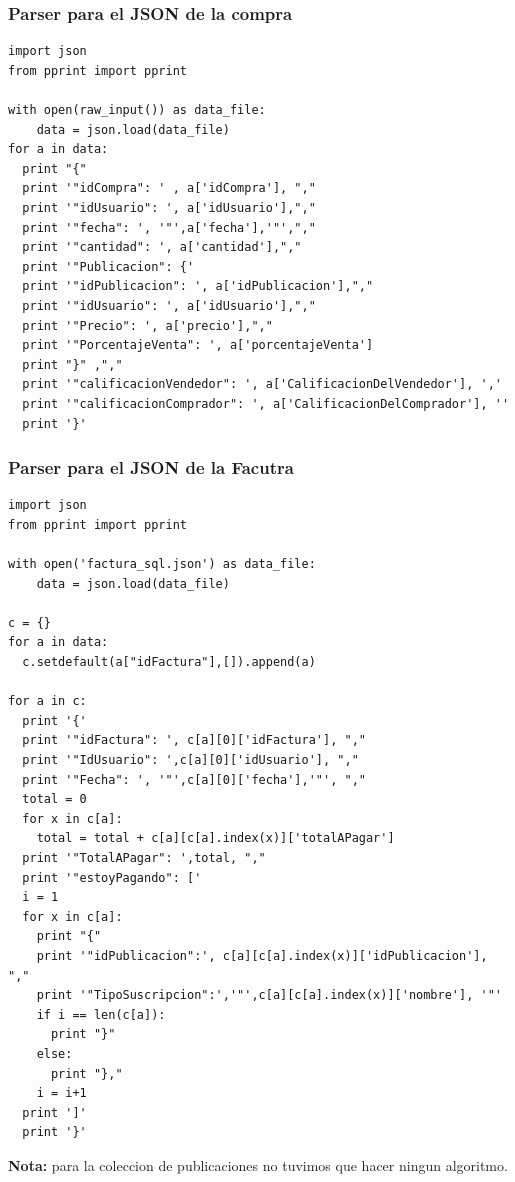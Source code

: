 \documentclass[a4paper, 10pt, twoside]{article}
\begin{document}
\subsubsection{Parser para el JSON de la compra}

\begin{verbatim}
import json
from pprint import pprint

with open(raw_input()) as data_file:    
    data = json.load(data_file)
for a in data:
  print "{"
  print '"idCompra": ' , a['idCompra'], ","
  print '"idUsuario": ', a['idUsuario'],","
  print '"fecha": ', '"',a['fecha'],'"',","
  print '"cantidad": ', a['cantidad'],","
  print '"Publicacion": {'
  print '"idPublicacion": ', a['idPublicacion'],","
  print '"idUsuario": ', a['idUsuario'],","
  print '"Precio": ', a['precio'],","
  print '"PorcentajeVenta": ', a['porcentajeVenta']
  print "}" ,","
  print '"calificacionVendedor": ', a['CalificacionDelVendedor'], ','
  print '"calificacionComprador": ', a['CalificacionDelComprador'], ''
  print '}'

\end{verbatim}

\newpage
\subsubsection{Parser para el JSON de la Facutra}

\begin{verbatim}
import json
from pprint import pprint

with open('factura_sql.json') as data_file:    
    data = json.load(data_file)

c = {}
for a in data:
  c.setdefault(a["idFactura"],[]).append(a)

for a in c:
  print '{'
  print '"idFactura": ', c[a][0]['idFactura'], ","
  print '"IdUsuario": ',c[a][0]['idUsuario'], ","
  print '"Fecha": ', '"',c[a][0]['fecha'],'"', ","
  total = 0
  for x in c[a]:
    total = total + c[a][c[a].index(x)]['totalAPagar']
  print '"TotalAPagar": ',total, ","
  print '"estoyPagando": ['
  i = 1
  for x in c[a]:
    print "{"
    print '"idPublicacion":', c[a][c[a].index(x)]['idPublicacion'], ","
    print '"TipoSuscripcion":','"',c[a][c[a].index(x)]['nombre'], '"'
    if i == len(c[a]):
      print "}"
    else:
      print "},"
    i = i+1
  print ']'
  print '}'

\end{verbatim}

\textbf{Nota:} para la coleccion de publicaciones no tuvimos que hacer ningun algoritmo.
\end{document}
